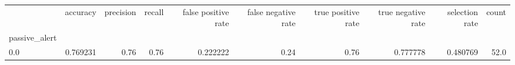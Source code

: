 \begin{tabular}{lrrrrrrrrr}
\toprule
{} &  accuracy &  precision &  recall &  false positive rate &  false negative rate &  true positive rate &  true negative rate &  selection rate &  count \\
passive\_alert &           &            &         &                      &                      &                     &                     &                 &        \\
\midrule
0.0           &  0.769231 &       0.76 &    0.76 &             0.222222 &                 0.24 &                0.76 &            0.777778 &        0.480769 &   52.0 \\
\bottomrule
\end{tabular}
